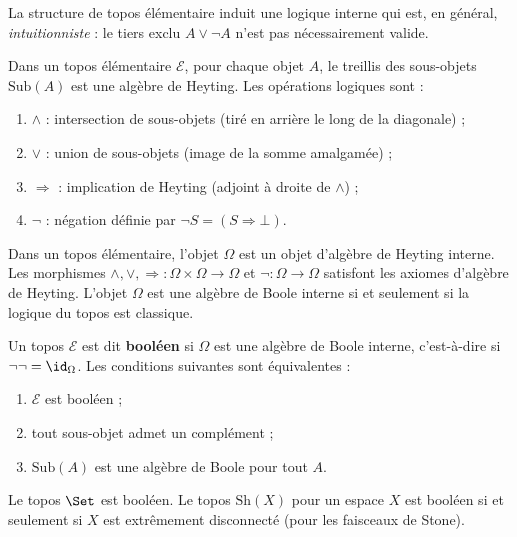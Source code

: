 
La structure de topos élémentaire induit une logique interne
qui est, en général, \emph{intuitionniste} : le tiers exclu
$A \vee \neg A$ n'est pas nécessairement valide.

\begin{definition}\label{def:heyting-interne}
Dans un topos élémentaire $\mathcal{E}$, pour chaque objet $A$,
le treillis des sous-objets $\mathrm{Sub}(A)$ est une algèbre de Heyting.
Les opérations logiques sont :
\begin{enumerate}[label=(\roman*)]
\item $\wedge$ : intersection de sous-objets (tiré en arrière le
      long de la diagonale) ;
\item $\vee$ : union de sous-objets (image de la somme
      amalgamée) ;
\item $\Rightarrow$ : implication de Heyting (adjoint à droite de
      $\wedge$) ;
\item $\neg$ : négation définie par $\neg S = (S \Rightarrow \bot)$.
\end{enumerate}
\end{definition}

\begin{proposition}\label{prop:omega-heyting}
Dans un topos élémentaire, l'objet $\Omega$ est un objet d'algèbre
de Heyting interne.  Les morphismes
$\wedge, \vee, \Rightarrow \colon \Omega \times \Omega \to \Omega$
et $\neg \colon \Omega \to \Omega$ satisfont les axiomes d'algèbre
de Heyting.  L'objet $\Omega$ est une algèbre de Boole interne si et
seulement si la logique du topos est classique.
\end{proposition}

\begin{remarque}\label{rem:topos-logique-classique}
Un topos $\mathcal{E}$ est dit \textbf{booléen} si $\Omega$ est
une algèbre de Boole interne, c'est-à-dire si
$\neg \neg = \id_\Omega$.  Les conditions suivantes sont
équivalentes :
\begin{enumerate}[label=(\roman*)]
\item $\mathcal{E}$ est booléen ;
\item tout sous-objet admet un complément ;
\item $\mathrm{Sub}(A)$ est une algèbre de Boole pour tout $A$.
\end{enumerate}
Le topos $\Set$ est booléen.  Le topos $\mathrm{Sh}(X)$ pour un
espace $X$ est booléen si et seulement si $X$ est
extrêmement disconnecté (pour les faisceaux de Stone).
\end{remarque}

